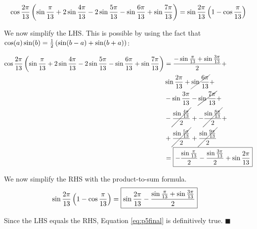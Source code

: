 \documentclass[10pt]{../usamts}
\begin{document}
\begin{solution}{5}
\begin{equation}
    \cos{{\frac{2\pi}{13}}}\left( \sin{{\frac{\pi}{13}}} + 2\sin{{\frac{4\pi}{13}}} - 2\sin{{\frac{5\pi}{13}}} - \sin{{\frac{6\pi}{13}}} + \sin{{\frac{7\pi}{13}}} \right)
    = \sin{{\frac{2\pi}{13}}}\left( 1 - \cos{{\frac{\pi}{13}}} \right)
    \label{eq:p5final}
\end{equation}

We now simplify the LHS. This is possible by using the fact that $\cos(a)\sin(b) = \frac{1}{2}\left( \sin(b-a) + \sin(b+a) \right)$:

\begin{align*}
    \cos{{\frac{2\pi}{13}}}\left( \sin{{\frac{\pi}{13}}} + 2\sin{{\frac{4\pi}{13}}} - 2\sin{{\frac{5\pi}{13}}} - \sin{{\frac{6\pi}{13}}} + \sin{{\frac{7\pi}{13}}} \right)
    &= \frac{-\sin{{\frac{\pi}{13}}} + \sin{{\frac{3\pi}{13}}}}{2} + \\
    &\sin{{\frac{2\pi}{13}}} + \cancel{\sin{{\frac{6\pi}{13}}}} + \\
    &- \sin{{\frac{3\pi}{13}}} -\cancel{\sin{{\frac{7\pi}{13}}}} + \\
    &-\cancel{\frac{\sin{{\frac{4\pi}{13}}}}{2}} + -\cancel{\frac{\sin{{\frac{8\pi}{13}}}}{2}} +\\
    &+ \cancel{\frac{\sin{{\frac{5\pi}{13}}}}{2}} + \cancel{\frac{\sin{{\frac{9\pi}{13}}}}{2}} \\
    &= \boxed{-\frac{\sin{{\frac{\pi}{13}}}}{2} - \frac{\sin{{\frac{3\pi}{13}}}}{2} + \sin{{\frac{2\pi}{13}}}}
\end{align*}

We now simplify the RHS with the product-to-sum formula.
\begin{align*}
    \sin{{\frac{2\pi}{13}}}\left( 1 - \cos{{\frac{\pi}{13}}} \right)
    &= \boxed{\sin{{\frac{2\pi}{13}}} - \frac{\sin{{\frac{\pi}{13}}} + \sin{{\frac{3\pi}{13}}}}{2}}
\end{align*}

Since the LHS equals the RHS, Equation \ref{eq:p5final} is definitively true.
$\blacksquare$
\end{solution}
\end{document}
